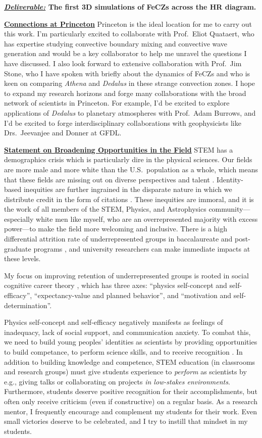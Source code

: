 \documentclass[12pt]{article}
\newcommand{\sct}[1]{\vspace{0.3cm}\hspace{-\parindent}\textbf{\underline{#1}}\hspace{0.3cm}}
\begin{document}
\textbf{\underline{\emph{Deliverable:}} The first 3D simulations of FeCZs across the HR diagram.}

\sct{Connections at Princeton}
Princeton is the ideal location for me to carry out this work.
I'm particularly excited to collaborate with Prof.~Eliot Quataert, who has expertise studying convective boundary mixing and convective wave generation and would be a key collaborator to help me unravel the questions I have discussed.
I also look forward to extensive collaboration with Prof.~Jim Stone, who I have spoken with briefly about the dynamics of FeCZs and who is keen on comparing \emph{Athena} and \emph{Dedalus} in these strange convection zones.
I hope to expand my research horizons and forge many collaborations with the broad network of scientists in Princeton.
For example, I'd be excited to explore applications of \emph{Dedalus} to planetary atmospheres with Prof.~Adam Burrows, and I'd be excited to forge interdisciplinary collaborations with geophysicists like Drs.~Jeevanjee and Donner at GFDL.

\sct{Statement on Broadening Opportunities in the Field}
STEM has a demographics crisis which is particularly dire in the physical sciences. 
Our fields are more male and more white than the U.S.~population as a whole, which means that these fields are missing out on diverse perspectives and talent \citep{stem_laborforce_2021}. 
Identity-based inequities are further ingrained in the disparate nature in which we distribute credit in the form of citations \citep{teich_etal_2022}.
These inequities are immoral, and it is the work of all members of the STEM, Physics, and Astrophysics community---especially white men like myself, who are an overrepresented majority with excess power---to make the field more welcoming and inclusive.
There is a high differential attrition rate of underrepresented groups in baccalaureate and post-graduate programs \citep{whitcomb_singh_2021}, and university researchers can make immediate impacts at these levels.

My focus on improving retention of underrepresented groups is rooted in social cognitive career theory \citep{kelly_2016}, which has three axes: ``physics self-concept and self-efficacy'', ``expectancy-value and planned behavior'', and ``motivation and self-determination''.

Physics self-concept and self-efficacy negatively manifests as feelings of inadequacy, lack of social support, and communication anxiety.
To combat this, we need to build young peoples' identities as scientists by providing opportunities to build competance, to perform science skills, and to receive recognition  \citep{hazari_etal_2010}.
In addition to building knowledge and competence, STEM education (in classrooms and research groups) must give students experience to \emph{perform} as scientists by e.g., giving talks or collaborating on projects \emph{in low-stakes environments}.
Furthermore, students deserve positive recognition for their accomplishments, but often only receive criticism (even if constructive) on a regular basis.
As a research mentor, I frequently encourage and complement my students for their work. 
Even small victories deserve to be celebrated, and I try to instill that mindset in my students.
\end{document}

